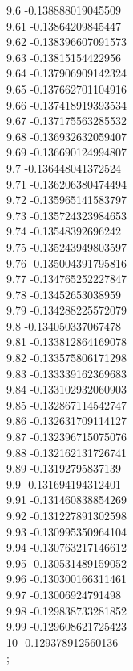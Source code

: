 {9.6	-0.138888019045509\\
9.61	-0.13864209845447\\
9.62	-0.138396607091573\\
9.63	-0.13815154422956\\
9.64	-0.137906909142324\\
9.65	-0.137662701104916\\
9.66	-0.137418919393534\\
9.67	-0.137175563285532\\
9.68	-0.136932632059407\\
9.69	-0.136690124994807\\
9.7	-0.136448041372524\\
9.71	-0.136206380474494\\
9.72	-0.135965141583797\\
9.73	-0.135724323984653\\
9.74	-0.13548392696242\\
9.75	-0.135243949803597\\
9.76	-0.135004391795816\\
9.77	-0.134765252227847\\
9.78	-0.13452653038959\\
9.79	-0.134288225572079\\
9.8	-0.134050337067478\\
9.81	-0.133812864169078\\
9.82	-0.133575806171298\\
9.83	-0.133339162369683\\
9.84	-0.133102932060903\\
9.85	-0.132867114542747\\
9.86	-0.132631709114127\\
9.87	-0.132396715075076\\
9.88	-0.132162131726741\\
9.89	-0.13192795837139\\
9.9	-0.131694194312401\\
9.91	-0.131460838854269\\
9.92	-0.131227891302598\\
9.93	-0.130995350964104\\
9.94	-0.130763217146612\\
9.95	-0.130531489159052\\
9.96	-0.130300166311461\\
9.97	-0.13006924791498\\
9.98	-0.129838733281852\\
9.99	-0.129608621725423\\
10	-0.129378912560136\\
};

